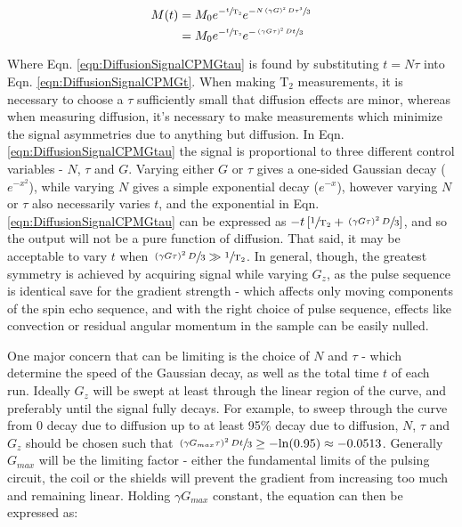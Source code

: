 \documentclass[PaulGanssle-Thesis.tex]{subfiles}
\begin{document}
\begin{align}
\label{eqn:DiffusionSignalCPMGt}
M(t) & = M_{0}e^{-\sfrac{t}{\mathrm{T}_{2}}}e^{-\sfrac{N\left(\gamma G\right)^2D\tau^3}{3}} \\
& = M_{0}e^{-\sfrac{t}{\mathrm{T}_{2}}}e^{-\sfrac{\left(\gamma G \tau\right)^2Dt}{3}}
\label{eqn:DiffusionSignalCPMGtau}
\end{align} 

Where Eqn. \ref{eqn:DiffusionSignalCPMGtau} is found by substituting $t = N\tau$ into Eqn. \ref{eqn:DiffusionSignalCPMGt}. When making $\mathrm{T}_{2}$ measurements, it is necessary to choose a $\tau$ sufficiently small that diffusion effects are minor, whereas when measuring diffusion, it's necessary to make measurements which minimize the signal asymmetries due to anything but diffusion. In Eqn. \ref{eqn:DiffusionSignalCPMGtau} the signal is proportional to three different control variables - $N$, $\tau$ and $G$. Varying either $G$ or $\tau$ gives a one-sided Gaussian decay ($e^{-x^2}$), while varying $N$ gives a simple exponential decay ($e^{-x}$), however varying $N$ or $\tau$ also necessarily varies $t$, and the exponential in Eqn. \ref{eqn:DiffusionSignalCPMGtau} can be expressed as $-t\left[\sfrac{1}{\mathrm{T}_{2}} + \sfrac{\left(\gamma G\tau\right)^{2}D}{3}\right]$, and so the output will not be a pure function of diffusion. That said, it may be acceptable to vary $t$ when $\sfrac{\left(\gamma G \tau\right)^{2}D}{3}\gg\sfrac{1}{\mathrm{T}_{2}}$. In general, though, the greatest symmetry is achieved by acquiring signal while varying $G_{z}$, as the pulse sequence is identical save for the gradient strength - which affects only moving components of the spin echo sequence, and with the right choice of pulse sequence, effects like convection or residual angular momentum in the sample can be easily nulled.

One major concern that can be limiting is the choice of $N$ and $\tau$ - which determine the speed of the Gaussian decay, as well as the total time $t$ of each run. Ideally $G_{z}$ will be swept at least through the linear region of the curve, and preferably until the signal fully decays. For example, to sweep through the curve from 0 decay due to diffusion up to at least 95\% decay due to diffusion, $N$, $\tau$ and $G_{z}$ should be chosen such that $\sfrac{\left(\gamma G_{max}\tau\right)^{2}Dt}{3} \geq -\mathrm{ln}(0.95) \approx -0.0513$. Generally $G_{max}$ will be the limiting factor - either the fundamental limits of the pulsing circuit, the coil or the shields will prevent the gradient from increasing too much and remaining linear. Holding $\gamma G_{max}$ constant, the equation can then be expressed as:
\end{document}
